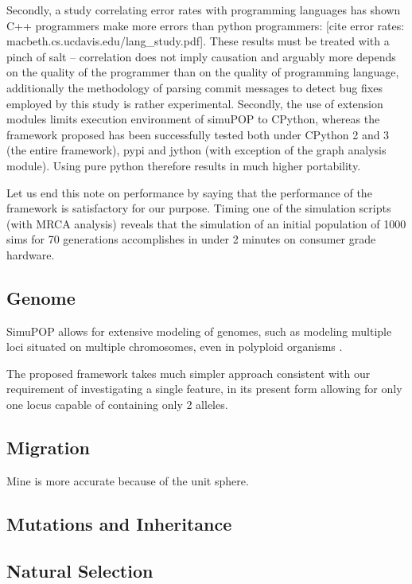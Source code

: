 \documentclass{l4proj}
\begin{document}
Secondly, a study correlating error rates with programming languages has shown C++ programmers make more errors than python programmers: [cite error rates: macbeth.cs.ucdavis.edu/lang\_study.pdf]. These results must be treated with a pinch of salt -- correlation does not imply causation and arguably more depends on the quality of the programmer than on the quality of programming language, additionally the methodology of parsing commit messages to detect bug fixes employed by this study is rather experimental.
\fi
Secondly, the use of extension modules limits execution environment of simuPOP to CPython, whereas the framework proposed has been successfully tested both under CPython 2 and 3 (the entire framework), pypi and jython (with exception of the graph analysis module). Using pure python therefore results in much higher portability.

Let us end this note on performance by saying that the performance of the framework is satisfactory for our purpose. Timing one of the simulation scripts (with MRCA analysis) reveals that the simulation of an initial population of 1000 sims for 70 generations accomplishes in under 2 minutes on consumer grade hardware.

\subsection{Genome}
SimuPOP allows for extensive modeling of genomes, such as modeling multiple loci situated on multiple \gls{chromosome}s, even in \gls{polyploid} organisms \parencite{simuPOP16}.

The proposed framework takes much simpler approach consistent with our requirement of investigating a single feature, in its present form allowing for only one \gls{locus} capable of containing only 2 alleles.

\subsection{Migration}
Mine is more accurate because of the unit sphere.

\subsection{Mutations and Inheritance}

\subsection{Natural Selection}
\end{document}
